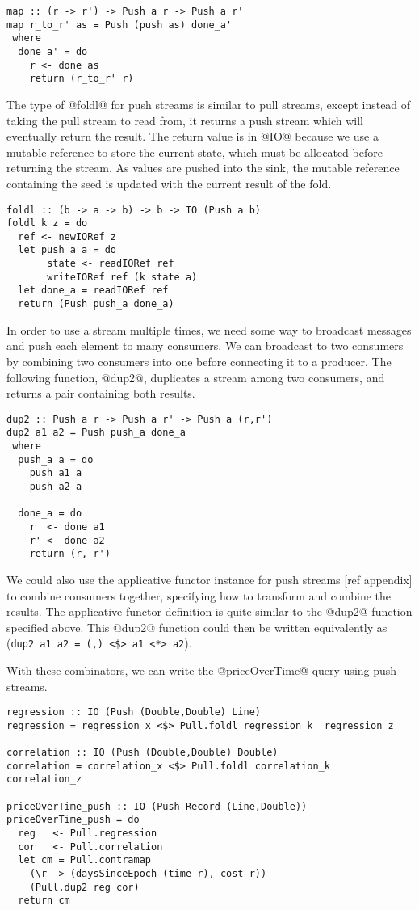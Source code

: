 \begin{lstlisting}
map :: (r -> r') -> Push a r -> Push a r'
map r_to_r' as = Push (push as) done_a'
 where
  done_a' = do
    r <- done as
    return (r_to_r' r)
\end{lstlisting}


The type of @foldl@ for push streams is similar to pull streams, except instead of taking the pull stream to read from, it returns a push stream which will eventually return the result.
The return value is in @IO@ because we use a mutable reference to store the current state, which must be allocated before returning the stream.
As values are pushed into the sink, the mutable reference containing the seed is updated with the current result of the fold.

\begin{lstlisting}
foldl :: (b -> a -> b) -> b -> IO (Push a b)
foldl k z = do
  ref <- newIORef z
  let push_a a = do
       state <- readIORef ref
       writeIORef ref (k state a)
  let done_a = readIORef ref
  return (Push push_a done_a)
\end{lstlisting}

In order to use a stream multiple times, we need some way to broadcast messages and push each element to many consumers.
We can broadcast to two consumers by combining two consumers into one before connecting it to a producer.
The following function, @dup2@, duplicates a stream among two consumers, and returns a pair containing both results.

\begin{lstlisting}
dup2 :: Push a r -> Push a r' -> Push a (r,r')
dup2 a1 a2 = Push push_a done_a
 where
  push_a a = do
    push a1 a
    push a2 a

  done_a = do
    r  <- done a1
    r' <- done a2
    return (r, r')
\end{lstlisting}

We could also use the applicative functor instance for push streams [ref appendix] to combine consumers together, specifying how to transform and combine the results.
The applicative functor definition is quite similar to the @dup2@ function specified above.
This @dup2@ function could then be written equivalently as (\lstinline/dup2 a1 a2 = (,) <$> a1 <*> a2/).

With these combinators, we can write the @priceOverTime@ query using push streams.

\begin{lstlisting}
regression :: IO (Push (Double,Double) Line)
regression = regression_x <$> Pull.foldl regression_k  regression_z

correlation :: IO (Push (Double,Double) Double)
correlation = correlation_x <$> Pull.foldl correlation_k  correlation_z

priceOverTime_push :: IO (Push Record (Line,Double))
priceOverTime_push = do
  reg   <- Pull.regression
  cor   <- Pull.correlation
  let cm = Pull.contramap
    (\r -> (daysSinceEpoch (time r), cost r))
    (Pull.dup2 reg cor)
  return cm
\end{lstlisting}

